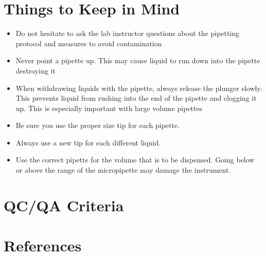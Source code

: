 \documentclass[12pt]{../SOP3_beta}\usepackage[]{graphicx}\usepackage[]{color}
\begin{document}
\section{Things to Keep in Mind}
\begin{itemize}
  \item Do not hesitate to ask the lab instructor questions about the pipetting protocol and measures to avoid contamination 
\item Never point a pipette up. This may cause liquid to run down into the pipette destroying it
\item When withdrawing liquids with the pipette, always release the plunger slowly. This prevents liquid from rushing into the end of the pipette and clogging it up.  This is especially important with large volume pipettes 
\item Be sure you use the proper size tip for each pipette. 
\item Always use a new tip for each different liquid.
\item Use the correct pipette for the volume that is to be dispensed. Going below or above the range of the micropipette may damage the instrument.      

\end{itemize}





\section{QC/QA Criteria}

\section{References}
\end{document}
